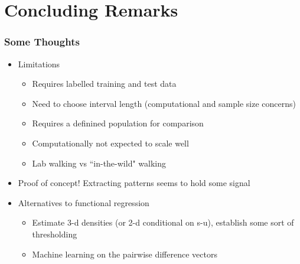 \documentclass[10pt]{beamer}\usepackage[]{graphicx}\usepackage[]{color}
\begin{document}
\section{Concluding Remarks}
\begin{frame}
\frametitle{Some Thoughts}
\begin{itemize}
\item Limitations
    \begin{itemize}
    \item Requires labelled training and test data
    \item Need to choose interval length (computational and sample size concerns)
    \item Requires a definined population for comparison
    \item Computationally not expected to scale well 
    \item Lab walking vs ``in-the-wild" walking
    \end{itemize}
\item Proof of concept! Extracting patterns seems to hold some signal
\item Alternatives to functional regression
    \begin{itemize}
    \item Estimate 3-d densities (or 2-d conditional on s-u), establish some sort of thresholding
    \item Machine learning on the pairwise difference vectors 
    \end{itemize}
\end{itemize}
\end{frame}
\end{document}
